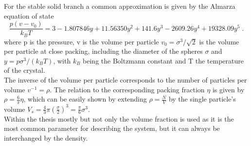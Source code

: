 For the stable solid branch a common approximation is given by the Almarza equation of state\cite{Almarza2009}
\begin{equation}
\frac{p(v-v_0)}{k_B T} = 3 - 1.807846 y + 11.56350 y^2 + 141.6 y^3 - 2609.26 y^4 + 19328.09 y^5 \; \text{.}
\end{equation}
where p is the pressure, v is the volume per particle $v_0=\sigma^3/\sqrt{2}$ is the volume per particle at close packing, including the diameter of the spheres $\sigma$ and $y=p \sigma^3 / (k_B T)$, with $k_B$ being the Boltzmann constant and T the temperature of the crystal.\\
The inverse of the volume per particle corresponds to the number of particles per volume $ v^{-1} = \rho$. The relation to the corresponding packing fraction $\eta$ is given by $\rho = \frac{6}{ \pi} \eta$, which can be easily shown by extending $\rho = \frac{N}{V}$ by the single particle's volume $V_s = \frac{4}{3} \pi \left(\frac{\sigma}{2}\right)^3 = \frac{\pi}{6} \sigma^3$.\\
Within the thesis mostly but not only the volume fraction is used as it is the most common parameter for describing the system, but it can always be interchanged by the density.\\ 

